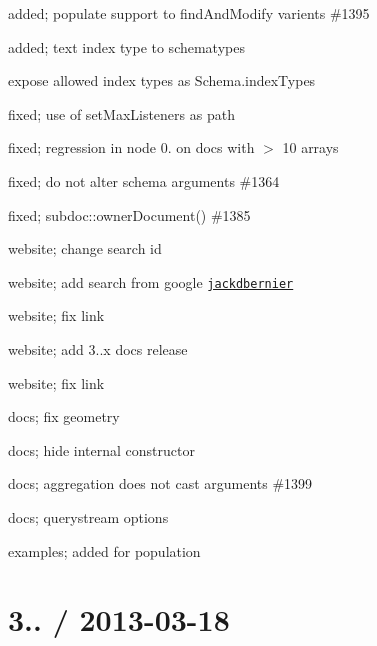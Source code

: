 \begin{DoxyItemize}
\item added; populate support to find\+And\+Modify varients \#1395
\item added; text index type to schematypes
\item expose allowed index types as Schema.\+index\+Types
\item fixed; use of {\ttfamily set\+Max\+Listeners} as path
\item fixed; regression in node 0. on docs with $>$ 10 arrays
\item fixed; do not alter schema arguments \#1364
\item fixed; subdoc\+::owner\+Document() \#1385
\item website; change search id
\item website; add search from google \href{https://github.com/jackdbernier}{\tt jackdbernier}
\item website; fix link
\item website; add 3..\+x docs release
\item website; fix link
\item docs; fix geometry
\item docs; hide internal constructor
\item docs; aggregation does not cast arguments \#1399
\item docs; querystream options
\item examples; added for population
\end{DoxyItemize}

\section*{3.. / 2013-\/03-\/18 }


